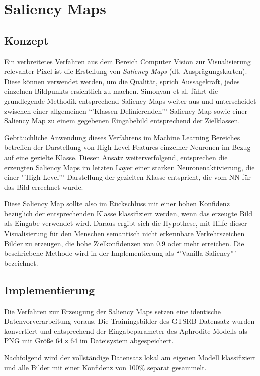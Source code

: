 \chapter{Saliency Maps}
\label{cha:saliency}

\section{Konzept}
Ein verbreitetes Verfahren aus dem Bereich Computer Vision zur Visualisierung relevanter Pixel ist die Erstellung von \textit{Saliency Maps} (dt. Ausprägungskarten). Diese können verwendet werden, um die Qualität, sprich Aussagekraft, jedes einzelnen Bildpunkts ersichtlich zu machen. Simonyan et al. \cite{simonyan_deep_2013} führt die grundlegende Methodik entsprechend Saliency Maps weiter aus und unterscheidet zwischen einer allgemeinen “'Klassen-Definierenden”' Saliency Map sowie einer Saliency Map zu einem gegebenen Eingabebild entsprechend der Zielklassen.


Gebräuchliche Anwendung dieses Verfahrens im Machine Learning Bereiches betreffen der Darstellung von High Level Features einzelner Neuronen \cite{liu_delving_2016} im Bezug auf eine gezielte Klasse. Diesen Ansatz weiterverfolgend, entsprechen die erzeugten Saliency Maps im letzten Layer einer starken Neuronenaktivierung, die einer "'High Level”' Darstellung der gezielten Klasse entspricht, die vom \ac{NN} für das Bild errechnet wurde. 


Diese Saliency Map sollte also im Rückschluss mit einer hohen Konfidenz bezüglich der entsprechenden Klasse klassifiziert werden, wenn das erzeugte Bild als Eingabe verwendet wird. Daraus ergibt sich die Hypothese, mit Hilfe dieser Visualisierung für den Menschen semantisch nicht erkennbare Verkehrszeichen Bilder zu erzeugen, die hohe Zielkonfidenzen von 0.9 oder mehr erreichen. Die beschriebene Methode wird in der Implementierung als “'Vanilla Saliency”' bezeichnet.

\section{Implementierung}

Die Verfahren zur Erzeugung der Saliency Maps setzen eine identische Datenvorverarbeitung voraus. 
Die Trainingsbilder des \ac{GTSRB} Datensatz wurden konvertiert und entsprechend der Eingabeparameter des Aphrodite-Modells als PNG mit Größe $64 \times 64 $ im Dateisystem abgespeichert.

Nachfolgend wird der vollständige Datensatz lokal am eigenen Modell klassifiziert und alle Bilder mit einer Konfidenz von 100\% separat gesammelt. 

